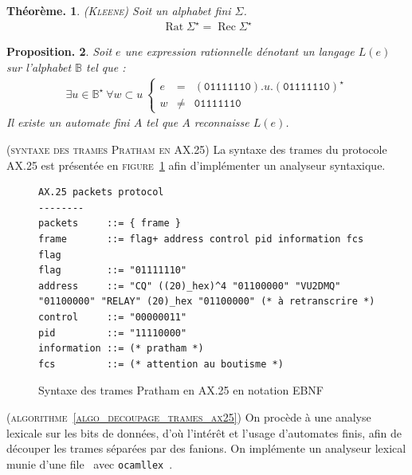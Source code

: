\documentclass[twocolumn,pre,floats,aps,amsmath,amssymb]{revtex4}
\newtheorem{theorem}{Th\'eor\`eme.}[section]
\newtheorem{proposition}[theorem]{Proposition.}
\newenvironment{implementation}[1][Impl\'ementation.]{\begin{trivlist}
\item[\hskip \labelsep {\bfseries #1}]}{\end{trivlist}}
\newenvironment{remark}[1][Remarque.]{\begin{trivlist}
\item[\hskip \labelsep {\bfseries #1}]}{\end{trivlist}}
\begin{document}
\begin{theorem}
  { \color{rltred}{\Radioactivity} }
  \textsc{(Kleene)} Soit un alphabet fini $\Sigma$.
  \begin{eqnarray*}
    \operatorname{Rat} \Sigma^{\star} = \operatorname{Rec} \Sigma^{\star} 
  \end{eqnarray*}
\end{theorem}

\begin{proposition}
  { \color{rltred}{\Radioactivity} }
  Soit $e$ une expression rationnelle d\'enotant un langage $L(e)$ sur l'alphabet $\mathbb{B}$ tel que :
  \begin{eqnarray}
    \exists u \in \mathbb{B}^{\star} \ \forall w \subset u \
    \left\{\begin{matrix}
        e &=& (\texttt{01111110}) . u . (\texttt{01111110})^{\star}\\ 
        w &\neq& \texttt{01111110}
      \end{matrix}\right.
  \end{eqnarray}
Il existe un automate fini $A$ tel que $A$ reconnaisse $L (e)$.
\end{proposition}

\begin{remark}
  (\textsc{syntaxe des trames Pratham en AX.25})
  La syntaxe des trames du protocole AX.25 est pr\'esent\'ee en \textsc{figure}~\ref{fig:EBNF_ax25} afin d'impl\'ementer un analyseur syntaxique.
\end{remark}

\begin{figure}
{\scriptsize
\begin{verbatim}
AX.25 packets protocol
--------
packets     ::= { frame }
frame       ::= flag+ address control pid information fcs flag
flag        ::= "01111110"
address     ::= "CQ" ((20)_hex)^4 "01100000" "VU2DMQ" "01100000" "RELAY" (20)_hex "01100000" (* à retranscrire *)
control     ::= "00000011"
pid         ::= "11110000"
information ::= (* pratham *)
fcs         ::= (* attention au boutisme *)
\end{verbatim}
}
\caption{Syntaxe des trames Pratham en AX.25 en notation EBNF}
\label{fig:EBNF_ax25}
\end{figure}


\begin{implementation}
  (\textsc{algorithme~\ref{algo_decoupage_trames_ax25}})
  { \color{rltred}{\Radioactivity} }
  On proc\`ede \`a une analyse lexicale sur les bits de donn\'ees, d'o\`u l'int\'er\^et et l'usage d'automates finis, afin de d\'ecouper les trames s\'epar\'ees par des fanions. On impl\'emente un analyseur lexical munie d'une file\cite{Comment2}~\cite{Knuth} avec \texttt{ocamllex}~\cite{ocaml_parsing}.
\end{implementation}
\end{document}
